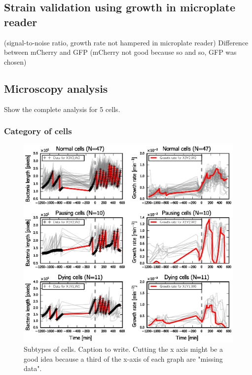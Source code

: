 \subsection{Strain validation using growth in microplate reader}

(signal-to-noise ratio, growth rate not hampered in microplate reader)
Difference between mCherry and GFP (mCherry not good because so and so, GFP was chosen)

\subsection{Microscopy analysis}

Show the complete analysis for 5 cells.

\subsubsection*{Category of cells}

\begin{figure}[p]
\centering
\includegraphics[scale=1]{./Fig/subcat_cells}
\caption{Subtypes of cells. Caption to write. Cutting the x axis might be a good idea because a third of the x-axis of each graph are "missing data".}
\label{fig:subcat_cells}
\end{figure}

